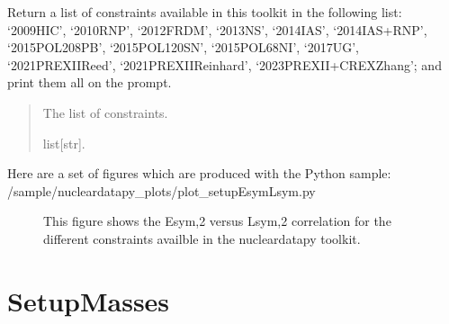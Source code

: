 \documentclass[letterpaper,10pt,english]{sphinxmanual}
\begin{document}

\begin{fulllineitems}
\label{\detokenize{source/api/setup_EsymLsym:nucleardatapy.setup_EsymLsym.constraints_EsymLsym}}
\pysigstartsignatures
{}
\pysigstopsignatures
\sphinxAtStartPar
Return a list of constraints available in this toolkit in the     following list: ‘2009\sphinxhyphen{}HIC’, ‘2010\sphinxhyphen{}RNP’, ‘2012\sphinxhyphen{}FRDM’, ‘2013\sphinxhyphen{}NS’,     ‘2014\sphinxhyphen{}IAS’, ‘2014\sphinxhyphen{}IAS+RNP’, ‘2015\sphinxhyphen{}POL\sphinxhyphen{}208PB’, ‘2015\sphinxhyphen{}POL\sphinxhyphen{}120SN’,     ‘2015\sphinxhyphen{}POL\sphinxhyphen{}68NI’, ‘2017\sphinxhyphen{}UG’, ‘2021\sphinxhyphen{}PREXII\sphinxhyphen{}Reed’,     ‘2021\sphinxhyphen{}PREXII\sphinxhyphen{}Reinhard’, ‘2023\sphinxhyphen{}PREXII+CREX\sphinxhyphen{}Zhang’; and     print them all on the prompt.
\begin{quote}\begin{description}
\sphinxAtStartPar
The list of constraints.

\sphinxAtStartPar
list{[}str{]}.

\end{description}\end{quote}

\end{fulllineitems}


\sphinxAtStartPar
Here are a set of figures which are produced with the Python sample: /sample/nucleardatapy\_plots/plot\_setupEsymLsym.py

\begin{figure}[htbp]
\centering
\capstart

\noindent{}
\caption{This figure shows the Esym,2 versus Lsym,2 correlation for the different constraints availble in the nucleardatapy toolkit.}\label{\detokenize{source/api/setup_EsymLsym:id1}}\end{figure}

\sphinxstepscope


\section{SetupMasses}
\label{\detokenize{source/api/setup_masses:setupmasses}}\label{\detokenize{source/api/setup_masses::doc}}\label{\detokenize{source/api/setup_masses:module-nucleardatapy.setup_masses}}
\end{document}
